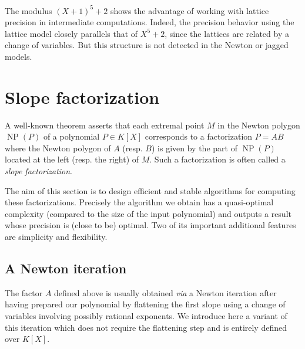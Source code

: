 \documentclass{sig-alternate-05-2015}
\DeclareMathOperator{\NP}{NP}
\begin{document}
The modulus $(X+1)^5 + 2$ shows the advantage of working
with lattice precision in intermediate computations.  Indeed,
the precision behavior using the lattice model closely parallels
that of $X^5+2$, since the lattices are related by a change of
variables.  But this structure is not detected in the Newton
or jagged models.

\section{Slope factorization} \label{sec:slope_fac}

A well-known theorem \cite[Theorem~6.1]{dwork-geratto-sullivan:Gfunctions} asserts that each 
extremal point $M$ in the Newton polygon $\NP(P)$ of a polynomial $P \in 
K[X]$ corresponds to a factorization $P = AB$ where the Newton polygon 
of $A$ (resp. $B$) is given by the part of $\NP(P)$ located at the left 
(resp. the right) of $M$. Such a factorization is often called a 
\emph{slope factorization}.

The aim of this section is to design efficient and stable algorithms 
for computing these factorizations. Precisely the algorithm we obtain 
has a quasi-optimal complexity (compared to the size of the input 
polynomial) and outputs a result whose precision is (close to be) 
optimal. Two of its important additional features are simplicity and 
flexibility.

\subsection{A Newton iteration}
\label{ssec:Newtoniter}

The factor $A$ defined above is usually obtained \emph{via} a Newton 
iteration after having prepared our polynomial by flattening the first 
slope using a change of variables involving possibly rational 
exponents. We introduce here a variant of this iteration which does not 
require the flattening step and is entirely defined over $K[X]$.
\end{document}
